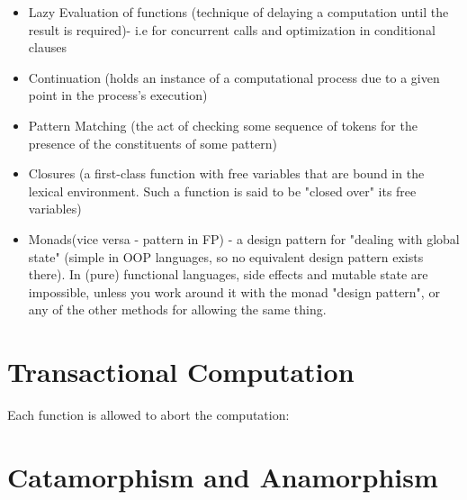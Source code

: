 \begin{itemize}
\begin{itemize}
		\item Lazy Evaluation of functions (technique of delaying a computation until the result is required)- i.e for concurrent calls and optimization in conditional clauses
		\item Continuation (holds an instance of a computational process due to a given point in the process's execution)
		\item Pattern Matching (the act of checking some sequence of tokens for the presence of the constituents of some pattern)
		\item Closures (a first-class function with free variables that are bound  in the lexical environment. Such a function is said to be "closed over" its free variables)
		\item Monads(vice versa - pattern in FP) - a design pattern for "dealing with global state" (simple in OOP languages, so no equivalent design pattern exists there). In (pure) functional languages, side effects and mutable state are impossible, unless you work around it with the monad "design pattern", or any of the other methods for allowing the same thing.
	\end{itemize}
\end{itemize}





\section{Transactional Computation}

Each function is allowed to abort the computation:



\section{Catamorphism and Anamorphism}


